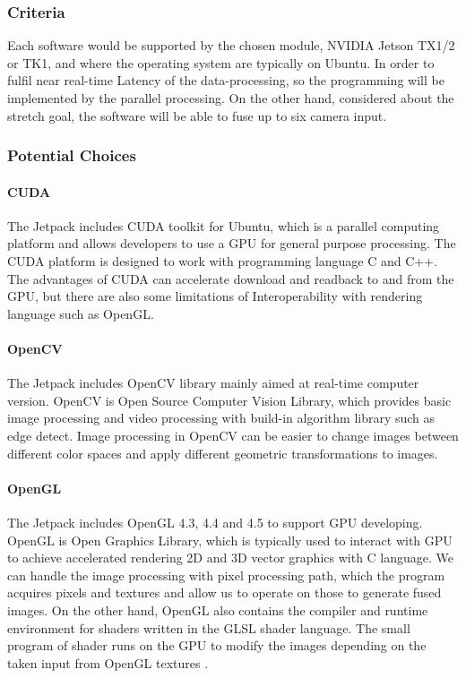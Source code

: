 \subsubsection{Criteria}
Each software would be supported by the chosen module, NVIDIA Jetson TX1/2 or TK1, and where 
the operating system are typically on Ubuntu. In order to fulfil near real-time Latency of 
the data-processing, so the programming will be implemented by the parallel processing. On 
the other hand, considered about the stretch goal, the software will be able to fuse up to 
six camera input.\\

\subsubsection{Potential Choices}
\paragraph{CUDA}
The Jetpack includes CUDA toolkit for Ubuntu, which is a parallel computing platform and 
allows developers to use a GPU for general purpose processing. The CUDA platform is designed 
to work with programming language C and C++. The advantages of CUDA can accelerate download 
and readback to and from the GPU, but there are also some limitations of Interoperability 
with rendering language such as OpenGL.\\

\paragraph{OpenCV}
The Jetpack includes OpenCV library mainly aimed at real-time computer version. OpenCV is 
Open Source Computer Vision Library, which provides basic image processing and video 
processing with build-in algorithm library such as edge detect. Image processing in OpenCV 
can be easier to change images between different color spaces and apply different geometric 
transformations to images.\\

\paragraph{OpenGL}
The Jetpack includes OpenGL 4.3, 4.4 and 4.5 to support GPU developing. OpenGL is Open Graphics Library, 
which is typically used to interact with GPU to achieve accelerated rendering 2D and 3D vector graphics 
with C language. We can handle the image processing with pixel processing path, which the program 
acquires pixels and textures and allow us to operate on those to generate fused images. On the other 
hand, OpenGL also contains the compiler and runtime environment for shaders written in the GLSL shader 
language. The small program of shader runs on the GPU to modify the images depending on the taken input 
from OpenGL textures \cite{shader}.\\ 

